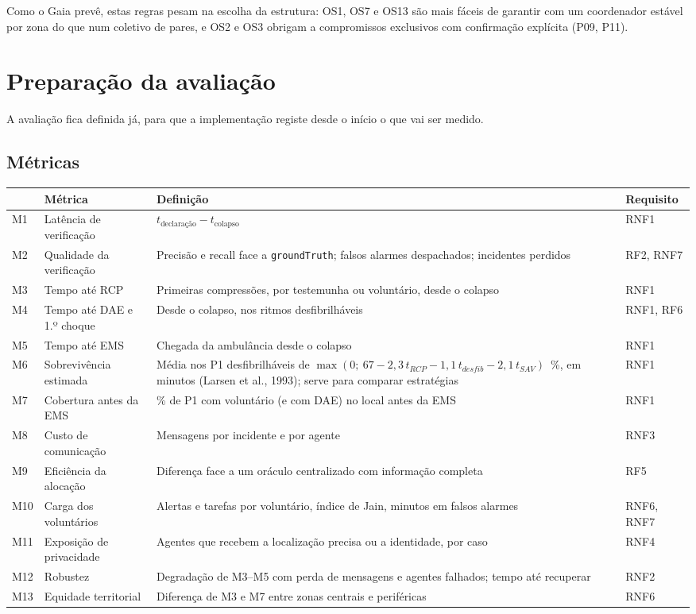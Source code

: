 \documentclass[10pt,a4paper]{article}
\newcommand{\id}[1]{\texttt{#1}}
\begin{document}
Como o Gaia prevê, estas regras pesam na escolha da estrutura: OS1, OS7 e OS13 são mais fáceis de garantir com um coordenador estável por zona do que num coletivo de pares, e OS2 e OS3 obrigam a compromissos exclusivos com confirmação explícita (P09, P11).

\section{Preparação da avaliação}\label{sec:avaliacao}

A avaliação fica definida já, para que a implementação registe desde o início o que vai ser medido.

\subsection{Métricas}\label{sec:metricas}

{\small
\begin{xltabular}{\linewidth}{@{}lP{3.6cm}Ll@{}}
\toprule
& Métrica & Definição & Requisito \\
\midrule
\endhead
M1 & Latência de verificação & $t_{\text{declaração}} - t_{\text{colapso}}$ & RNF1 \\
M2 & Qualidade da verificação & Precisão e recall face a \id{groundTruth}; falsos alarmes despachados; incidentes perdidos & RF2, RNF7 \\
M3 & Tempo até RCP & Primeiras compressões, por testemunha ou voluntário, desde o colapso & RNF1 \\
M4 & Tempo até DAE e 1.º choque & Desde o colapso, nos ritmos desfibrilháveis & RNF1, RF6 \\
M5 & Tempo até EMS & Chegada da ambulância desde o colapso & RNF1 \\
M6 & Sobrevivência estimada & Média nos P1 desfibrilháveis de $\max(0;\ 67 - 2{,}3\,t_{RCP} - 1{,}1\,t_{desfib} - 2{,}1\,t_{SAV})$~\%, em minutos (Larsen et al., 1993); serve para comparar estratégias & RNF1 \\
M7 & Cobertura antes da EMS & \% de P1 com voluntário (e com DAE) no local antes da EMS & RNF1 \\
M8 & Custo de comunicação & Mensagens por incidente e por agente & RNF3 \\
M9 & Eficiência da alocação & Diferença face a um oráculo centralizado com informação completa & RF5 \\
M10 & Carga dos voluntários & Alertas e tarefas por voluntário, índice de Jain, minutos em falsos alarmes & RNF6, RNF7 \\
M11 & Exposição de privacidade & Agentes que recebem a localização precisa ou a identidade, por caso & RNF4 \\
M12 & Robustez & Degradação de M3--M5 com perda de mensagens e agentes falhados; tempo até recuperar & RNF2 \\
M13 & Equidade territorial & Diferença de M3 e M7 entre zonas centrais e periféricas & RNF6 \\
\bottomrule
\end{xltabular}
}
\end{document}
